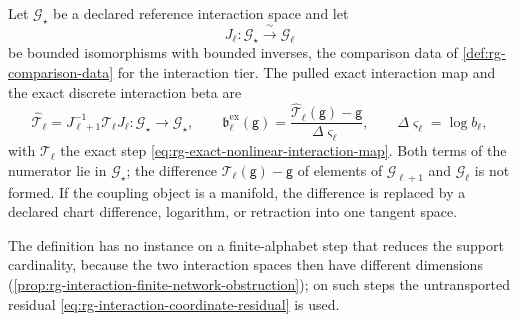 Let \(\mathcal G_\star\) be a declared reference interaction space and let
\begin{equation}
J_\ell:\mathcal G_\star\xrightarrow{\ \sim\ }\mathcal G_\ell
\label{eq:rg-interaction-trivialization}
\end{equation}
be bounded isomorphisms with bounded inverses, the comparison data of
\cref{def:rg-comparison-data} for the interaction tier. The pulled exact
interaction map and the exact discrete interaction beta are
\begin{equation}
\widehat{\mathcal T}_\ell
=J_{\ell+1}^{-1}\mathcal T_\ell J_\ell:
\mathcal G_\star\longrightarrow\mathcal G_\star,
\qquad
\mathfrak b^{\mathrm{ex}}_\ell(\mathsf g)
=\frac{\widehat{\mathcal T}_\ell(\mathsf g)-\mathsf g}{\Delta\varsigma_\ell},
\qquad
\Delta\varsigma_\ell=\log b_\ell,
\label{eq:rg-interaction-beta}
\end{equation}
with \(\mathcal T_\ell\) the exact step
\eqref{eq:rg-exact-nonlinear-interaction-map}. Both terms of the numerator lie
in \(\mathcal G_\star\); the difference \(\mathcal T_\ell(\mathsf g)-\mathsf g\) of
elements of \(\mathcal G_{\ell+1}\) and \(\mathcal G_\ell\) is not formed. If
the coupling object is a manifold, the difference is replaced by a declared
chart difference, logarithm, or retraction into one tangent space.

The definition has no instance on a finite-alphabet step that reduces the
support cardinality, because the two interaction spaces then have different
dimensions (\cref{prop:rg-interaction-finite-network-obstruction}); on such
steps the untransported residual \eqref{eq:rg-interaction-coordinate-residual}
is used.

